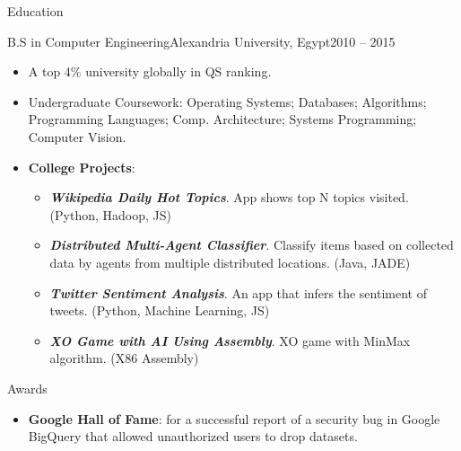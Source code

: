 \documentclass[]{ahmedamrcv}
\begin{document}
 
	\begin{cvsection}{Education}
		\begin{cvsubsection}{B.S in Computer Engineering}{Alexandria University, Egypt}{2010 -- 2015}
			\begin{itemize}
                    \item A top 4\% university globally in QS ranking.
				\item Undergraduate Coursework: Operating Systems; Databases; Algorithms; Programming Languages; Comp. Architecture; Systems Programming; Computer Vision.
                    \item \textbf{College Projects}:
                        \begin{itemize}
            			\item \textbf{\textit{Wikipedia Daily Hot Topics}}. App shows top N topics visited. (Python, Hadoop, JS)
        				\item \textbf{\textit{Distributed Multi-Agent Classifier}}. Classify items based on collected data by agents from multiple distributed locations. (Java, JADE)
        				\item \textbf{\textit{Twitter Sentiment Analysis}}. An app that infers the sentiment of tweets. (Python, Machine Learning, JS)
        				\item \textbf{\textit{XO Game with AI Using Assembly}}. XO game with MinMax algorithm. (X86 Assembly)
    			     \end{itemize}
                \end{itemize}
		\end{cvsubsection}
        \begin{cvsection}{Awards}
            \begin{cvsubsection}{}{}{}
            \begin{itemize}
                \item \textbf{Google Hall of Fame}: for a successful report of a security bug in Google BigQuery that allowed unauthorized users to drop datasets.
            \end{itemize}
            \end{cvsubsection}
            \end{cvsection}
	\end{cvsection}
       
\end{document}
